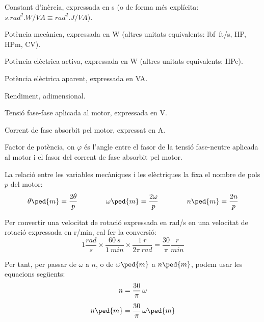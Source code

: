 \begin{list}{}
   \item[$H$] Constant d'inèrcia, expressada en \unit{s} (o de forma més explícita:
   $\unit{s.rad^2.W/VA} \equiv \unit{rad^2.J/VA}$).
   \item[$P\ped{m}$] Potència mecànica, expressada en \unit{W} (altres unitats equivalents: \unit{lbf.ft/s}, \unit{HP},  \unit{HPm}, \unit{CV}).
   \item[$P$] Potència elèctrica activa, expressada en \unit{W} (altres unitats equivalents: \unit{HPe}).
   \item[$S$] Potència elèctrica aparent, expressada en \unit{VA}.
   \item[$\eta$] Rendiment, adimensional.
   \item[$U$] Tensió fase-fase aplicada al motor, expressada en \unit{V}.
   \item[$I$] Corrent de fase absorbit pel motor, expressat en \unit{A}.
   \item[$\cos\varphi$] Factor de potència, on $\varphi$ és l'angle entre el fasor de la tensió fase-neutre aplicada al motor i el fasor del corrent de fase absorbit pel motor.
\end{list}

La relació entre les variables mecàniques i les elèctriques la fixa el nombre de pols $p$ del motor:
\begin{equation}\label{eq:vel-ele-mec}
    \theta\ped{m} = \frac{2\theta}{p} \qquad\qquad
    \omega\ped{m} = \frac{2\omega}{p} \qquad\qquad
    n\ped{m} = \frac{2n}{p}
\end{equation}

Per  convertir una velocitat de rotació expressada en \unit{rad/s} en una velocitat de rotació expressada en \unit{r/min}, cal fer la conversió:
\begin{equation}
 1\frac{\unit{rad}}{\unit{s}} \times \frac{\qty{60}{s}}{\qty{1}{min}} \times \frac{\qty{1}{r}}{2\pi\,\unit{rad}} = \frac{30}{\pi}\frac{\unit{r}}{\unit{min}}
 \end{equation}

 Per tant, per passar de $\omega$ a $n$, o de $\omega\ped{m}$ a $n\ped{m}$, podem usar les equacions següents:
\begin{subequations}\index{motors d'inducció!velocitat}
\begin{align}
    n        &= \frac{30}{\pi} \,\omega \\[1ex]
    n\ped{m} &= \frac{30}{\pi} \,\omega\ped{m}
\end{align}
\end{subequations}

